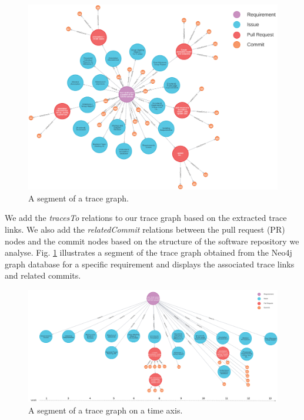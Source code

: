 \begin{figure}[htb]
    \centering
    \includegraphics[width=1\linewidth]{figs/rawTraceGraph.png}
    \caption{A segment of a trace graph.}
    \label{fig:rawtracegraph}
  \end{figure}

  We add the \emph{tracesTo} relations to our trace graph based on the extracted trace links. We also add the \emph{relatedCommit} relations between the pull request (PR) nodes and the commit nodes based on the structure of the software repository we analyse. Fig. \ref{fig:rawtracegraph} illustrates a segment of the trace graph obtained from the Neo4j graph database for a specific requirement and displays the associated trace links and related commits.

\begin{figure}[htb]
    \centering
    \includegraphics[width=.99\linewidth]{figs/traceGraph.png}
    \caption{A segment of a trace graph on a time axis.}
    \label{fig:tracegraph}
\end{figure}


